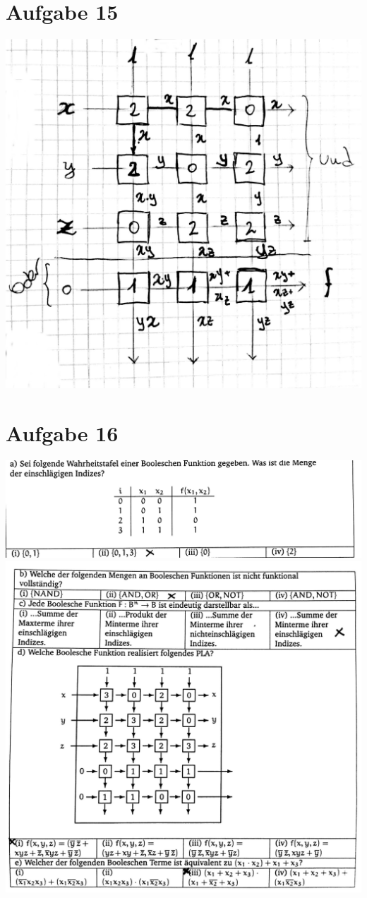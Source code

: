 \documentclass[12pt,a4paper]{article}
\begin{document}
\newpage
\section{Aufgabe 15}
\includegraphics[scale=0.21]{b.jpg} 

\newpage
\section{Aufgabe 16}
\includegraphics[scale=0.21]{c.jpg} 
\includegraphics[scale=0.21]{d.jpg} 
\end{document}
